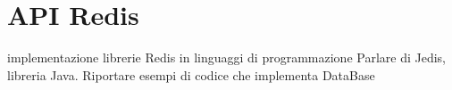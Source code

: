 \chapter{API Redis}
implementazione librerie Redis in linguaggi di programmazione
Parlare di Jedis, libreria Java.
Riportare esempi di codice che implementa DataBase
